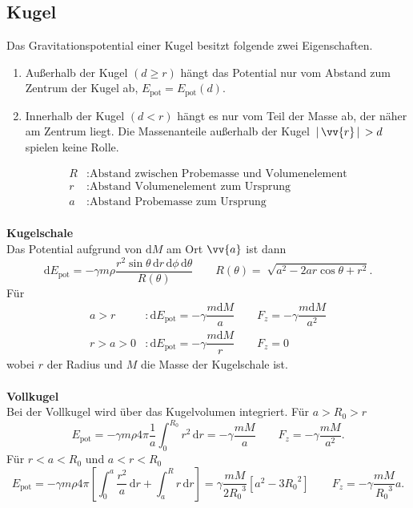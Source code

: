 \documentclass[a4paper,12pt]{article}
\newcommand{\td}{\,\text{d}}
\numberwithin{equation}{section}
\begin{document}
\subsection{Kugel}
Das Gravitationspotential einer Kugel besitzt folgende zwei Eigenschaften.
\begin{enumerate}[label=\arabic*]
        \item Außerhalb der Kugel $\left(d\geq r\right)$ hängt das Potential nur vom Abstand zum Zentrum der Kugel ab, $E_{\text{pot}}=E_{\text{pot}}\left(d\right)$.
        \item Innerhalb der Kugel $\left(d<r\right)$ hängt es nur vom Teil der Masse ab, der näher am Zentrum liegt. Die Massenanteile außerhalb der Kugel $\,|\, \vv{r}\,|\, >d$ spielen keine Rolle.
\end{enumerate}
\begin{align*}
        R&:\text{Abstand zwischen Probemasse und Volumenelement}\\
        r&:\text{Abstand Volumenelement zum Ursprung}\\
        a&:\text{Abstand Probemasse zum Ursprung}
\end{align*}
\hfill\\\textbf{Kugelschale}\\
Das Potential aufgrund von $\text{d}M$ am Ort $\vv{a}$ ist dann
\[ 
        \text{d}E_{\text{pot}}=-\gamma m\rho \dfrac{r^2\sin \theta\, \text{d}r\,\text{d}\phi \,\text{d}\theta }{R\left(\theta \right)}\qquad R\left(\theta \right)=\sqrt[]{a^2-2ar\cos \theta +r^2}
.\] 
Für 
\begin{align*}
        a>r&:\text{d}E_{\text{pot}}=-\gamma \dfrac{m\text{d}M}{a}\qquad F_z=-\gamma \dfrac{m\text{d}M}{a^2}\\
        r>a>0&:\text{d}E_{\text{pot}}=-\gamma \dfrac{m\text{d}M}{r}\qquad F_z=0
\end{align*}
wobei $r$ der Radius und $M$ die Masse der Kugelschale ist.
\\\hfill\\\textbf{Vollkugel}\\ 
Bei der Vollkugel wird über das Kugelvolumen integriert. Für $a>R_0>r$ 
\[ 
        E_{\text{pot}}=-\gamma m\rho 4\pi \dfrac{1}{a}\int_{0}^{R_0}r^2\td r=-\gamma \dfrac{mM}{a}\qquad F_z=-\gamma \dfrac{mM}{a^2}
.\] 
Für $r<a<R_0$ und $a<r<R_0$
\[ 
        E_{\text{pot}}=-\gamma m\rho 4\pi \left[\int_{0}^{a}\dfrac{r^2}{a}\td r+\int_{a}^{R}r\td r\right]=\gamma \dfrac{mM}{2{R_0}^3}\left[a^2-3{R_0}^2\right]\qquad F_z=-\gamma \dfrac{mM}{{R_0}^3}a
.\] 
\end{document}

